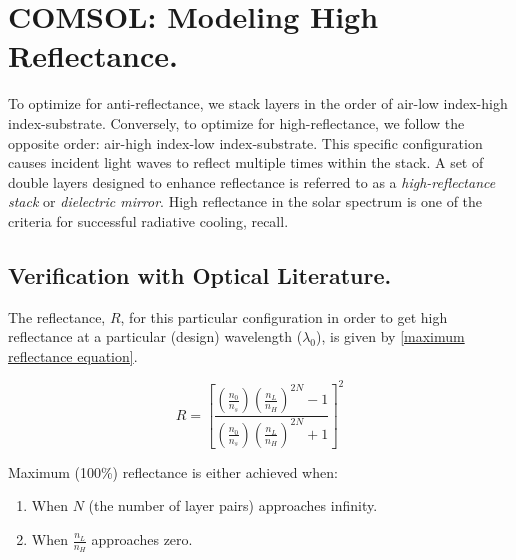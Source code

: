 \section{COMSOL: Modeling High Reflectance.}
To optimize for anti-reflectance, we stack layers in the order of air-low index-high index-substrate. Conversely, to optimize for high-reflectance, we follow the opposite order: air-high index-low index-substrate. This specific configuration causes incident light waves to reflect multiple times within the stack. A set of double layers designed to enhance reflectance is referred to as a \emph{high-reflectance stack} or \emph{dielectric mirror}. High reflectance in the solar spectrum is one of the criteria for successful radiative cooling, recall.



\subsection{Verification with Optical Literature.}
The reflectance, $R$, for this particular configuration in order to get high reflectance at a particular (design) wavelength ($\lambda_0$), is given by \ref{maximum reflectance equation}.

\begin{equation}\label{maximum reflectance equation - chap4}
    R = \left[ \frac{ \left( \frac{n_0}{n_s} \right) \left( \frac{n_L}{n_H} \right)^{2N}  - 1 }{  \left( \frac{n_0}{n_s} \right) \left( \frac{n_L}{n_H} \right)^{2N}  + 1}  \right]^2
\end{equation}

Maximum (100\%) reflectance is either achieved when:
\begin{enumerate}
    \item When $N$ (the number of layer pairs) approaches infinity.
    \item When $\frac{n_L}{n_H}$ approaches zero.
\end{enumerate}

